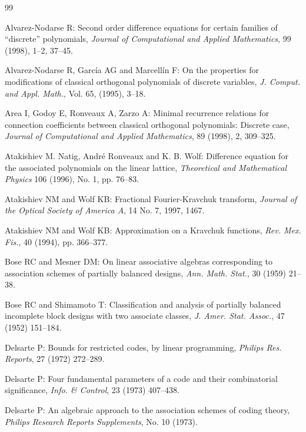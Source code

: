 \begin{thebibliography}{99}

 Alvarez-Nodarse R: Second order difference equations for certain families of ``discrete'' polynomials, \emph{Journal of Computational and Applied Mathematics}, 99 (1998), 1--2, 37--45.

 Alvarez-Nodarse R, Garc\'ia AG and Marcell\'in F: On the properties for modifications of classical orthogonal polynomials of discrete variables, \emph{J. Comput. and Appl. Math.}, Vol. 65, (1995), 3--18.

 Area I, Godoy E, Ronveaux A, Zarzo A: Minimal recurrence relations for connection coefficients between classical orthogonal polynomials: Discrete case, \emph{Journal of Computational and Applied Mathematics}, 89 (1998), 2, 309--325.

 Atakishiev M. Natig, Andr\'e Ronveaux and K. B. Wolf: Difference equation for the associated polynomials on the linear lattice, \emph{Theoretical and Mathematical Physics} 106 (1996), No. 1, pp. 76--83.

 Atakishiev NM and Wolf KB: Fractional Fourier-Kravchuk transform, \emph{Journal of the Optical Society of America A}, 14 No. 7, 1997, 1467.

 Atakishiev NM and Wolf KB: Approximation on a Kravchuk functions, \emph{Rev. Mex. Fis.}, 40 (1994), pp. 366--377.

 Bose RC and Mesner DM: On linear associative algebras corresponding to association schemes of partially balanced designs, \emph{Ann. Math. Stat.}, 30 (1959) 21--38.

 Bose RC and Shimamoto T: Classification and analysis of partially balanced incomplete block designs with two associate classes, \emph{J. Amer. Stat. Assoc.}, 47 (1952) 151--184.

 Delsarte P: Bounds for restricted codes, by linear programming, \emph{Philips Res. Reports}, 27 (1972) 272--289.

 Delsarte P: Four fundamental parameters of a code and their combinatorial significance, \emph{Info. \& Control}, 23 (1973) 407--438.

 Delsarte P: An algebraic approach to the association schemes of coding theory, \emph{Philips Research Reports Supplements}, No. 10 (1973).


\end{thebibliography}
